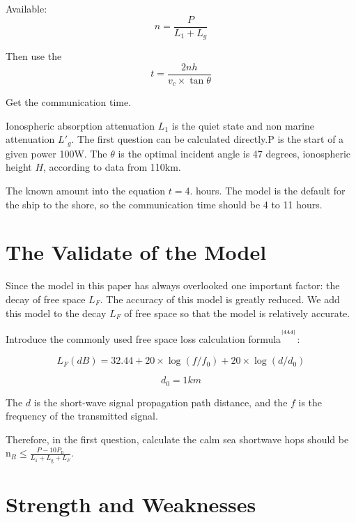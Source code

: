 \documentclass{mcmthesis}
\newcommand{\upcite}[1]%
{\textsuperscript{\textsuperscript{\cite{#1}}}}
\begin{document}
Available:
\begin{equation} \label{42}
n = \frac{P}{{{L_1} + {L_g}}}
\end{equation}

Then use the
\begin{equation} \label{43}
t = \frac{{2nh}}{{{v_c} \times \tan \theta }}
\end{equation}

Get the communication time.

Ionospheric absorption attenuation $L_1$ is the quiet state and non marine attenuation $L{'_g}$. The first question can be calculated directly.P is the start of a given power 100W. The $\theta$ is the optimal incident angle is 47 degrees, ionospheric height $H$, according to data from 110km.

The known amount into the equation $t = 4$. hours. The model is the default for the ship to the shore, so the communication time should be 4 to 11 hours.


\section{The Validate of the Model}
Since the model in this paper has always overlooked one important factor: the decay of free space $L_F$.  The accuracy of this model is greatly reduced. We add this model to the decay $L_F$ of free space so that the model is relatively accurate.

Introduce the commonly used free space loss calculation formula$^{\upcite{444}}$:%

\begin{equation} \label{44}
{L_F}(dB) = 32.44 + 20 \times \log (f/{f_0}) + 20 \times \log (d/{d_0})
\end{equation}

\begin{equation} \label{45}
{d_0} = 1km
\end{equation}

The $d$ is the short-wave signal propagation path distance, and the $f$ is the frequency of the transmitted signal.

Therefore, in the first question, calculate the calm sea shortwave hops should be ${{\text{n}}_R} \leqslant \frac{{P - 10{P_{\text{n}}}}}{{{L_1} + {L_{\text{g}}} + {L_F}}}$.








\section{Strength and Weaknesses}
\end{document}

